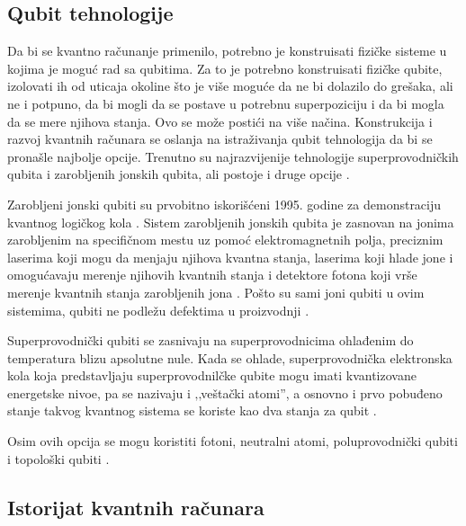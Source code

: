 \documentclass[fleqn, 12pt]{article}
\begin{document}
\newpage

\subsection{Qubit tehnologije}

\begin{text}
Da bi se kvantno računanje primenilo, potrebno je konstruisati fizičke sisteme u kojima je moguć rad sa qubitima. Za to je potrebno konstruisati fizičke qubite, izolovati ih od uticaja okoline što je više moguće da ne bi dolazilo do grešaka, ali ne i potpuno, da bi mogli da se postave u potrebnu superpoziciju i da bi mogla da se mere njihova stanja. Ovo se može postići na više načina. Konstrukcija i razvoj kvantnih računara se oslanja na istraživanja qubit tehnologija da bi se pronašle najbolje opcije. Trenutno su najrazvijenije tehnologije superprovodničkih qubita i zarobljenih jonskih qubita, ali postoje i druge opcije \cite{G1}.

Zarobljeni jonski qubiti su prvobitno iskorišćeni 1995. godine za demonstraciju kvantnog logičkog kola \cite{G1}. Sistem zarobljenih jonskih qubita je zasnovan na jonima zarobljenim na specifičnom mestu uz pomoć elektromagnetnih polja, preciznim laserima koji mogu da menjaju njihova kvantna stanja, laserima koji hlade jone i omogućavaju merenje njihovih kvantnih stanja i detektore fotona koji vrše merenje kvantnih stanja zarobljenih jona \cite{G1}. Pošto su sami joni qubiti u ovim sistemima, qubiti ne podležu defektima u proizvodnji \cite{G1}.

Superprovodnički qubiti se zasnivaju na superprovodnicima ohlađenim do temperatura blizu apsolutne nule. Kada se ohlade, superprovodnička elektronska kola koja predstavljaju superprovodnilčke qubite mogu imati kvantizovane energetske nivoe, pa se nazivaju i ‚‚veštački atomi'', a osnovno i prvo pobuđeno stanje takvog kvantnog sistema se koriste kao dva stanja za qubit \cite{G1}.

Osim ovih opcija se mogu koristiti fotoni, neutralni atomi, poluprovodnički qubiti i topološki qubiti \cite{G1}.
\end{text}

\subsection{Istorijat kvantnih računara}
\end{document}
